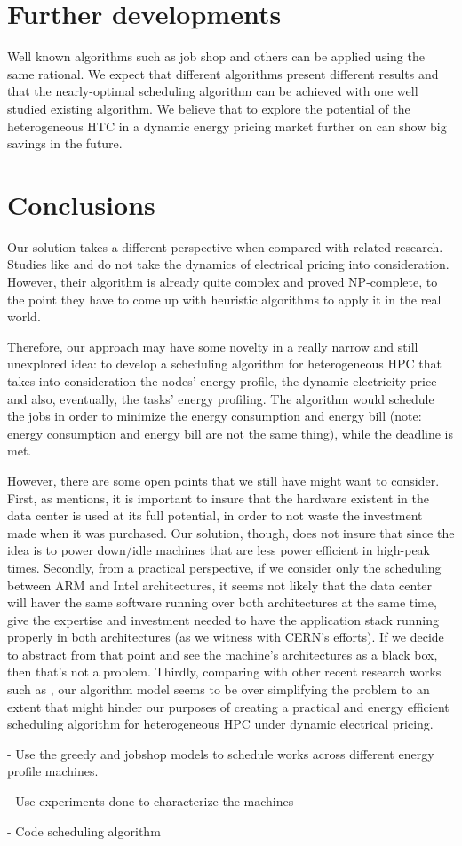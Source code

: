 \section{Further developments}

Well known algorithms such as job shop and others can be applied using the same rational. We expect that different algorithms present different results and that the nearly-optimal scheduling algorithm can be achieved with one well studied existing algorithm. We believe that to explore the potential of the heterogeneous HTC in a dynamic energy pricing market further on can show big savings in the future.

\section{Conclusions}

Our solution takes a different perspective when compared with related research. Studies like  \cite{TASK_SCHED} and \cite{EXE_METHOD} do not take the
dynamics of electrical pricing into consideration. However, their algorithm is
already quite complex and proved NP-complete, to the point they have to come up
with heuristic algorithms to apply it in the real world.

Therefore, our approach may have some novelty in a really narrow and still
unexplored idea: to develop a scheduling algorithm for heterogeneous HPC that
takes into consideration the nodes' energy profile, the dynamic electricity
price and also, eventually, the tasks' energy profiling. The algorithm would
schedule the jobs in order to minimize the energy consumption and energy bill
(note: energy consumption and energy bill are not the same thing), while the
deadline is met. 

However, there are some open points that we still have might want to
consider. First, as \cite{DYN_PRICING_HPC} mentions, it is important to insure
that the hardware existent in the data center is used at its full potential, in
order to not waste the investment made when it was purchased. Our solution,
though, does not insure that since the idea is to power down/idle machines that 
are less power efficient in high-peak times. Secondly, from a practical
perspective, if we consider only the scheduling between ARM and Intel architectures, 
it seems not likely that the data center will haver the same software running
over both architectures at the same time, give the expertise and investment
needed to have the application stack running properly in both architectures (as
we witness with CERN's efforts). If we decide to abstract from that point and
see the machine's architectures as a black box, then that's not a problem. Thirdly, 
comparing with other recent research works
such as \cite{TASK_SCHED}, our algorithm model seems to be over simplifying the
problem to an extent that might hinder our purposes of creating a practical and
energy efficient scheduling algorithm for heterogeneous HPC under dynamic
electrical pricing.





- Use the greedy and jobshop models to schedule works across different energy
  profile machines. 

- Use experiments done to characterize the machines 

- Code scheduling algorithm


